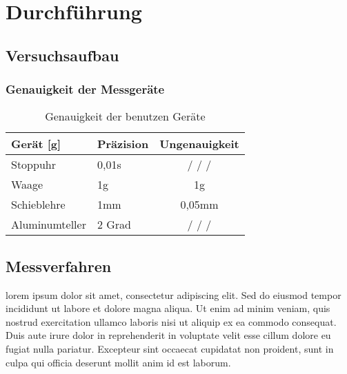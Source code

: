 \chapter{Durchführung}

\section{Versuchsaufbau}

\subsection*{Genauigkeit der Messgeräte}
\begin{table}[h!]
    \centering
    \begin{tabular}{l | l | c}
    Gerät [g] & Präzision & Ungenauigkeit \\
    \hline
    Stoppuhr        & 0,01s     & / / / \\
    Waage           & 1g        & 1g \\
    Schieblehre     & 1mm       & 0,05mm \\
    Aluminumteller  & 2 Grad    & / / / \\
    \hline
    \end{tabular}
    \caption{Genauigkeit der benutzen Geräte \cite{Stoppuhr,Waage}}
    \label{tab:genauigkeit_der_geräte}
\end{table}

\section{Messverfahren}
lorem ipsum dolor sit amet, consectetur adipiscing elit. Sed do eiusmod tempor incididunt ut labore et dolore magna aliqua. Ut enim ad minim veniam, quis nostrud exercitation ullamco laboris nisi ut aliquip ex ea commodo consequat. Duis aute irure dolor in reprehenderit in voluptate velit esse cillum dolore eu fugiat nulla pariatur. Excepteur sint occaecat cupidatat non proident, sunt in culpa qui officia deserunt mollit anim id est laborum.
